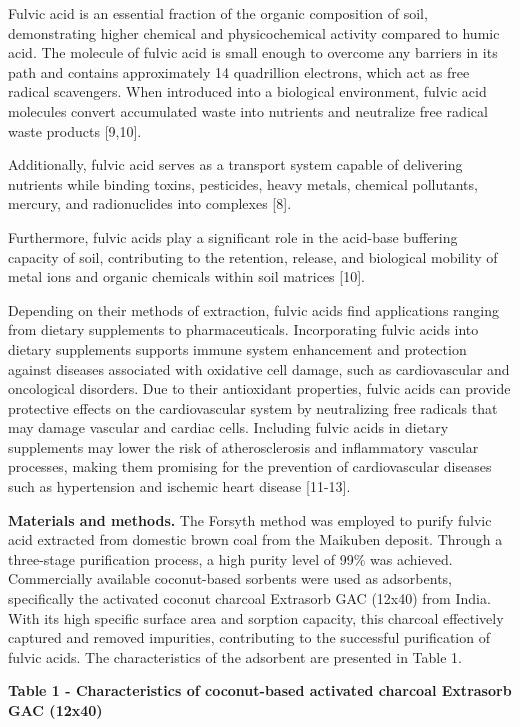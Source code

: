 Fulvic acid is an essential fraction of the organic composition of soil,
demonstrating higher chemical and physicochemical activity compared to
humic acid. The molecule of fulvic acid is small enough to overcome any
barriers in its path and contains approximately 14 quadrillion
electrons, which act as free radical scavengers. When introduced into a
biological environment, fulvic acid molecules convert accumulated waste
into nutrients and neutralize free radical waste products {[}9,10{]}.

Additionally, fulvic acid serves as a transport system capable of
delivering nutrients while binding toxins, pesticides, heavy metals,
chemical pollutants, mercury, and radionuclides into complexes {[}8{]}.

Furthermore, fulvic acids play a significant role in the acid-base
buffering capacity of soil, contributing to the retention, release, and
biological mobility of metal ions and organic chemicals within soil
matrices {[}10{]}.

Depending on their methods of extraction, fulvic acids find applications
ranging from dietary supplements to pharmaceuticals. Incorporating
fulvic acids into dietary supplements supports immune system enhancement
and protection against diseases associated with oxidative cell damage,
such as cardiovascular and oncological disorders. Due to their
antioxidant properties, fulvic acids can provide protective effects on
the cardiovascular system by neutralizing free radicals that may damage
vascular and cardiac cells. Including fulvic acids in dietary
supplements may lower the risk of atherosclerosis and inflammatory
vascular processes, making them promising for the prevention of
cardiovascular diseases such as hypertension and ischemic heart disease
{[}11-13{]}.

{\bfseries Materials and methods.} The Forsyth method was employed to
purify fulvic acid extracted from domestic brown coal from the Maikuben
deposit. Through a three-stage purification process, a high purity level
of 99\% was achieved. Commercially available coconut-based sorbents were
used as adsorbents, specifically the activated coconut charcoal
Extrasorb GAC (12x40) from India. With its high specific surface area
and sorption capacity, this charcoal effectively captured and removed
impurities, contributing to the successful purification of fulvic acids.
The characteristics of the adsorbent are presented in Table 1.

{\bfseries Table 1 - Characteristics of coconut-based activated charcoal
Extrasorb GAC (12x40)}

